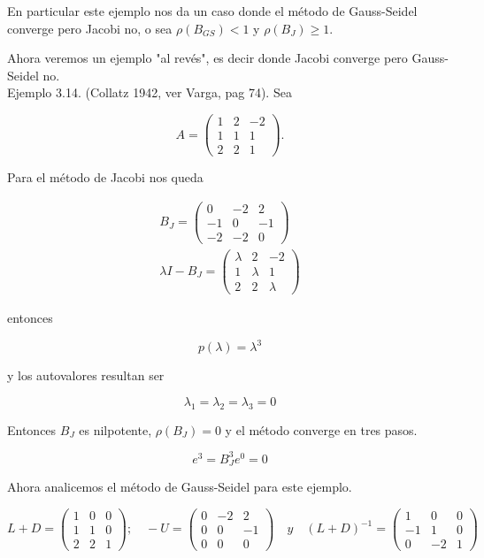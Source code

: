 \documentclass[10pt]{book}
\begin{document}
En particular este ejemplo nos da un caso donde el método de Gauss-Seidel converge pero Jacobi no, o sea $\rho\left(B_{G S}\right)<1$ y $\rho\left(B_{J}\right) \geq 1$.

Ahora veremos un ejemplo "al revés", es decir donde Jacobi converge pero Gauss-Seidel no.\\
Ejemplo 3.14. (Collatz 1942, ver Varga, pag 74). Sea

$$
A=\left(\begin{array}{ccc}
1 & 2 & -2 \\
1 & 1 & 1 \\
2 & 2 & 1
\end{array}\right) .
$$

Para el método de Jacobi nos queda

$$
\begin{gathered}
B_{J}=\left(\begin{array}{ccc}
0 & -2 & 2 \\
-1 & 0 & -1 \\
-2 & -2 & 0
\end{array}\right) \\
\lambda I-B_{J}=\left(\begin{array}{ccc}
\lambda & 2 & -2 \\
1 & \lambda & 1 \\
2 & 2 & \lambda
\end{array}\right)
\end{gathered}
$$

entonces

$$
p(\lambda)=\lambda^{3}
$$

y los autovalores resultan ser

$$
\lambda_{1}=\lambda_{2}=\lambda_{3}=0
$$

Entonces $B_{J}$ es nilpotente, $\rho\left(B_{J}\right)=0$ y el método converge en tres pasos.

$$
e^{3}=B_{J}^{3} e^{0}=0
$$

Ahora analicemos el método de Gauss-Seidel para este ejemplo.

$$
L+D=\left(\begin{array}{ccc}
1 & 0 & 0 \\
1 & 1 & 0 \\
2 & 2 & 1
\end{array}\right) ; \quad-U=\left(\begin{array}{ccc}
0 & -2 & 2 \\
0 & 0 & -1 \\
0 & 0 & 0
\end{array}\right) \quad y \quad(L+D)^{-1}=\left(\begin{array}{ccc}
1 & 0 & 0 \\
-1 & 1 & 0 \\
0 & -2 & 1
\end{array}\right)
$$
\end{document}
